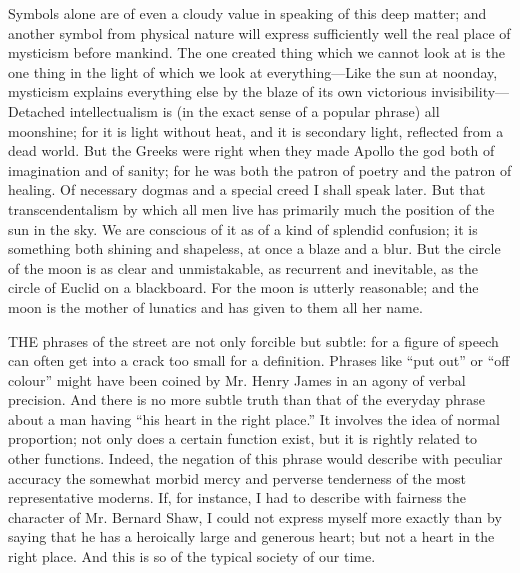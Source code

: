 Symbols alone are of even a cloudy value in speaking of this deep matter; and another symbol from physical nature will express sufficiently well the real place of mysticism before mankind. The one created thing which we cannot look at is the one thing in the light of which we look at everything—Like the sun at noonday, mysticism explains everything else by the blaze of its own victorious invisibility—Detached intellectualism is (in the exact sense of a popular phrase) all moonshine; for it is light without heat, and it is secondary light, reflected from a dead world. But the Greeks were right when they made Apollo the god both of imagination and of sanity; for he was both the patron of poetry and the patron of healing. Of necessary dogmas and a special creed I shall speak later. But that transcendentalism by which all men live has primarily much the position of the sun in the sky. We are conscious of it as of a kind of splendid confusion; it is something both shining and shapeless, at once a blaze and a blur. But the circle of the moon is as clear and unmistakable, as recurrent and inevitable, as the circle of Euclid on a blackboard. For the moon is utterly reasonable; and the moon is the mother of lunatics and has given to them all her name.


THE phrases of the street are not only forcible but subtle: for a figure of speech can often get into a crack too small for a definition. Phrases like “put out” or “off colour” might have been coined by Mr. Henry James in an agony of verbal precision. And there is no more subtle truth than that of the everyday phrase about a man having “his heart in the right place.” It involves the idea of normal proportion; not only does a certain function exist, but it is rightly related to other functions. Indeed, the negation of this phrase would describe with peculiar accuracy the somewhat morbid mercy and perverse tenderness of the most representative moderns. If, for instance, I had to describe with fairness the character of Mr. Bernard Shaw, I could not express myself more exactly than by saying that he has a heroically large and generous heart; but not a heart in the right place. And this is so of the typical society of our time.


